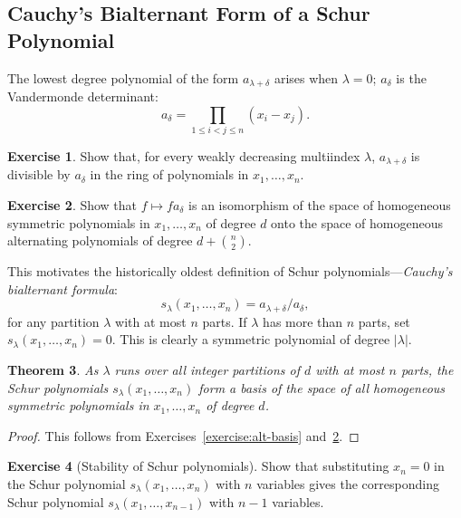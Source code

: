 \documentclass[11pt]{amsproc}
\newtheorem{theorem}{Theorem}[subsection]
\theoremstyle{definition}
\theoremstyle{example}
\newtheorem{exercise}[theorem]{Exercise}
\begin{document}
\subsection{Cauchy's Bialternant Form of a Schur Polynomial}
\label{sec:cauchys-bialt-form}
The lowest degree polynomial of the form $a_{\lambda+\delta}$ arises when $\lambda=0$; $a_\delta$ is the Vandermonde determinant:
\begin{displaymath}
  a_\delta = \prod_{1\leq i<j\leq n}(x_i-x_j).
\end{displaymath}
\begin{exercise}
  Show that, for every weakly decreasing multiindex $\lambda$, $a_{\lambda+\delta}$ is divisible by $a_\delta$ in the ring of polynomials in $x_1,\dotsc,x_n$.
\end{exercise}
\begin{exercise}
  \label{exercise:vandermonde-iso}
  Show that $f\mapsto fa_\delta$ is an isomorphism of the space of homogeneous symmetric polynomials in $x_1,\dotsc, x_n$ of degree $d$ onto the space of homogeneous alternating polynomials of degree $d + \binom n2$.
\end{exercise}
This motivates the historically oldest definition of Schur polynomials---\emph{Cauchy's bialternant formula}:
\begin{equation}
  \label{eq:schur}
  s_\lambda(x_1,\dotsc,x_n) = a_{\lambda+\delta}/a_\delta,
\end{equation}
for any partition $\lambda$ with at most $n$ parts.
If $\lambda$ has more than $n$ parts, set $s_\lambda(x_1,\dotsc,x_n) =0$.
This is clearly a symmetric polynomial of degree $|\lambda|$.
\begin{theorem}
  As $\lambda$ runs over all integer partitions of $d$ with at most $n$ parts, the Schur polynomials $s_\lambda(x_1,\dotsc,x_n)$ form a basis of the space of all homogeneous symmetric polynomials in $x_1,\dotsc,x_n$ of degree $d$.
\end{theorem}
\begin{proof}
  This follows from Exercises~\ref{exercise:alt-basis} and~\ref{exercise:vandermonde-iso}.
\end{proof}
\begin{exercise}
  [Stability of Schur polynomials]
  Show that substituting $x_n=0$ in the Schur polynomial $s_\lambda(x_1,\dotsc, x_n)$ with $n$ variables gives the corresponding Schur polynomial $s_\lambda(x_1,\dotsc,x_{n-1})$ with $n-1$ variables.
\end{exercise}
\end{document}
